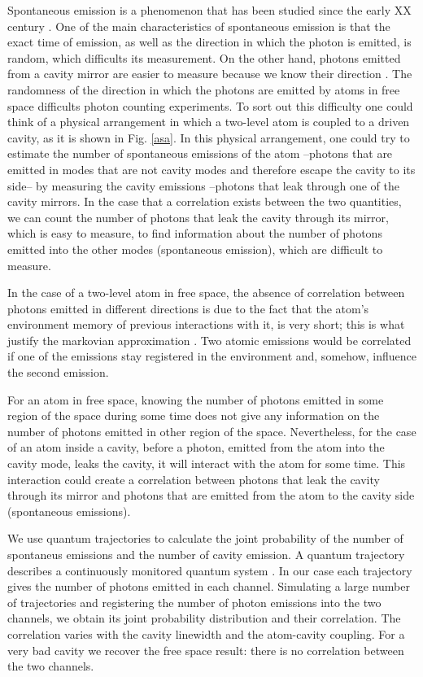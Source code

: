 \documentclass[%
 reprint,
 amsmath,amssymb,
 aps, 
]{revtex4-1}
\begin{document}
Spontaneous emission is a phenomenon that has been studied since the
early XX century \cite{10.2307/94746, 1917PhyZ...18..121E}. One of the
main characteristics of spontaneous emission is that the exact time of
emission, as well as the direction in which the photon is emitted, is
random, which difficults its measurement. On the other hand, photons
emitted from a cavity mirror are easier to measure because we know
their direction \cite{326305, doi:10.1063/1.113345}. The randomness of
the direction in which the photons are emitted by atoms in free space
difficults photon counting experiments. To sort out this difficulty
one could think of a physical arrangement in which a two-level atom is
coupled to a driven cavity, as it is shown in Fig. \ref{asa}. In this
physical arrangement, one could try to estimate the number of
spontaneous emissions of the atom --photons that are emitted in modes
that are not cavity modes and therefore escape the cavity to its
side-- by measuring the cavity emissions --photons that leak through
one of the cavity mirrors. In the case that a correlation exists
between the two quantities, we can count the number of photons that
leak the cavity through its mirror, which is easy to measure, to find
information about the number of photons emitted into the other modes
(spontaneous emission), which are difficult to measure.

In the case of a two-level atom in free space, the absence of
correlation between photons emitted in different directions is due to
the fact that the atom's environment memory of previous interactions
with it, is very short; this is what justify the markovian
approximation \cite{daley2014quantum}. Two atomic emissions would be
correlated if one of the emissions stay registered in the environment
and, somehow, influence the second emission.

For an atom in free space, knowing the number of photons emitted in
some region of the space during some time does not give any
information on the number of photons emitted in other region of the
space. Nevertheless, for the case of an atom inside a cavity, before a
photon, emitted from the atom into the cavity mode, leaks the cavity,
it will interact with the atom for some time. This interaction could
create a correlation between photons that leak the cavity through its
mirror and photons that are emitted from the atom to the cavity side
(spontaneous emissions).

We use quantum trajectories to calculate the joint probability of the
number of spontaneus emissions and the number of cavity emission. A
quantum trajectory describes a continuously monitored quantum system
\cite{Carmichael1993Open}. In our case each trajectory gives the
number of photons emitted in each channel. Simulating a large number
of trajectories and registering the number of photon emissions into
the two channels, we obtain its joint probability distribution and
their correlation. The correlation varies with the cavity linewidth
and the atom-cavity coupling. For a very bad cavity we recover the
free space result: there is no correlation between the two channels.
\end{document}
